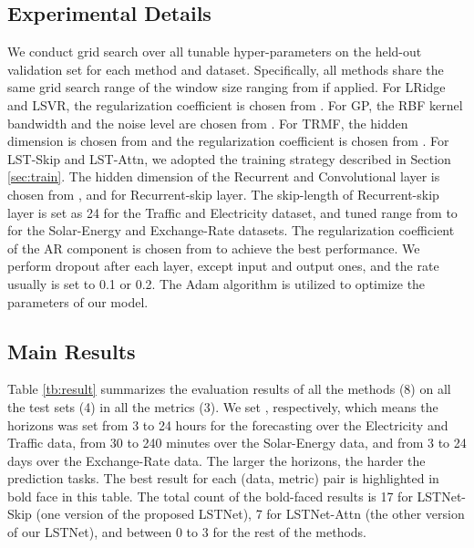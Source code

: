 \documentclass[sigconf]{acmart}
\def\electricity{{\sf Electricity}\xspace}
\def\traffic{{\sf Traffic}\xspace}
\def\solar{{\sf Solar-Energy}\xspace}
\def\exchange{{\sf Exchange-Rate}\xspace}
\def\LRidge{{\sf LRidge}\xspace}
\def\LSVR{{\sf LSVR}\xspace}
\def\GP{{\sf GP}\xspace}
\def\TRMF{{\sf TRMF}\xspace}
\begin{document}
\subsection{Experimental Details}
We conduct grid search over all tunable hyper-parameters on the held-out validation set for each method and dataset. Specifically, all methods share the same grid search range of the window size  ranging from  if applied. For \LRidge and \LSVR, the regularization coefficient  is chosen from . For \GP, the RBF kernel bandwidth  and the noise level  are chosen from . For \TRMF, the hidden dimension is chosen from  and the regularization coefficient  is chosen from .  For LST-Skip and LST-Attn, we adopted the training strategy described in Section \ref{sec:train}. The hidden dimension of the Recurrent and Convolutional layer is chosen from , and  for Recurrent-skip layer. The skip-length  of Recurrent-skip layer is set as 24 for the \traffic and \electricity dataset, and tuned range from  to  for the \solar and \exchange datasets. The regularization coefficient of the AR component is chosen from  to achieve the best performance. We perform dropout after each layer, except input and output ones, and the rate usually is set to 0.1 or 0.2. The Adam\cite{kingma2014adam} algorithm is utilized to optimize the parameters of our model.


\subsection{Main Results}
\label{sec:result}
 

Table \ref{tb:result} summarizes the evaluation results of all the methods (8) on all the test sets (4) in all the metrics (3). We set , respectively, which means the horizons was set from 3 to 24 hours for the forecasting over the \electricity and \traffic data, from 30 to 240 minutes over the \solar data, and from 3 to 24 days over the \exchange data. The larger the horizons, the harder the prediction tasks. The best result for each (data, metric) pair is highlighted in bold face in this table.  The total count of the bold-faced results is 17 for LSTNet-Skip (one version of the proposed LSTNet), 7 for LSTNet-Attn (the other version of our LSTNet), and between 0 to 3 for the rest of the methods.
\end{document}
